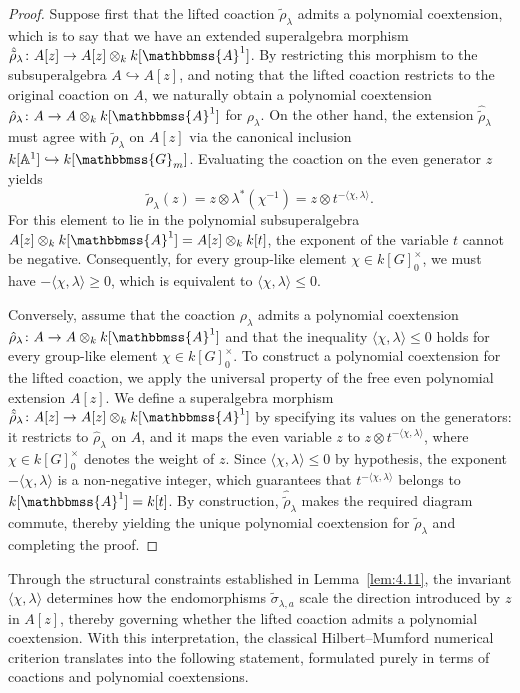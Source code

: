 \documentclass[11pt,a4paper,reqno,noamsfonts]{amsart}
\numberwithin{equation}{section}
\theoremstyle{definition}
\theoremstyle{remark}
\renewcommand{\AA}{\ensuremath{\mathbbmss{A}}}
\newcommand{\GG}{\ensuremath{\mathbbmss{G}}}
\begin{document}
\begin{proof}
Suppose first that the lifted coaction $\tilde{\rho}_\lambda$ admits a polynomial coextension, which is to say that we have an extended superalgebra morphism $\hat{\tilde{\rho}}_\lambda \colon A[z] \to A[z] \otimes_k k[\AA^1]$. By restricting this morphism to the subsuperalgebra $A \hookrightarrow A[z]$, and noting that the lifted coaction restricts to the original coaction on $A$, we naturally obtain a polynomial coextension $\hat{\rho}_\lambda \colon A \to A \otimes_k k[\AA^1]$ for $\rho_\lambda$. On the other hand, the extension $\hat{\tilde{\rho}}_\lambda$ must agree with $\tilde{\rho}_\lambda$ on $A[z]$ via the canonical inclusion $k[\mathbb{A}^1] \hookrightarrow k[\GG_m]$. Evaluating the coaction on the even generator $z$ yields
$$
\tilde{\rho}_\lambda(z) = z \otimes \lambda^*(\chi^{-1}) = z \otimes t^{-\langle \chi, \lambda \rangle}.
$$
For this element to lie in the polynomial subsuperalgebra $A[z] \otimes_k k[\AA^1] = A[z] \otimes_k k[t]$, the exponent of the variable $t$ cannot be negative. Consequently, for every group-like element $\chi \in k[G]_0^\times$, we must have $-\langle \chi, \lambda \rangle \ge 0$, which is equivalent to $\langle \chi, \lambda \rangle \le 0$.

Conversely, assume that the coaction $\rho_\lambda$ admits a polynomial coextension $\hat{\rho}_\lambda \colon A \to A \otimes_k k[\AA^1]$ and that the inequality $\langle \chi, \lambda \rangle \le 0$ holds for every group-like element $\chi \in k[G]_0^\times$. To construct a polynomial coextension for the lifted coaction, we apply the universal property of the free even polynomial extension $A[z]$. We define a superalgebra morphism $\hat{\tilde{\rho}}_\lambda \colon A[z] \to A[z] \otimes_k k[\AA^1]$ by specifying its values on the generators: it restricts to $\hat{\rho}_\lambda$ on $A$, and it maps the even variable $z$ to $z \otimes t^{-\langle \chi, \lambda \rangle}$, where $\chi \in k[G]_0^\times$ denotes the weight of $z$. Since $\langle \chi, \lambda \rangle \le 0$ by hypothesis, the exponent $-\langle \chi, \lambda \rangle$ is a non-negative integer, which guarantees that $t^{-\langle \chi, \lambda \rangle}$ belongs to $k[\AA^1] = k[t]$. By construction, $\hat{\tilde{\rho}}_\lambda$ makes the required diagram commute, thereby yielding the unique polynomial coextension for $\tilde{\rho}_\lambda$ and completing the proof.
\end{proof}

Through the structural constraints established in Lemma~\ref{lem:4.11}, the invariant $\langle \chi, \lambda \rangle$ determines how the endomorphisms $\tilde{\sigma}_{\lambda,a}$ scale the direction introduced by $z$ in $A[z]$, thereby governing whether the lifted coaction admits a polynomial coextension. With this interpretation, the classical Hilbert--Mumford numerical criterion translates into the following statement, formulated purely in terms of coactions and polynomial coextensions.
\end{document}
